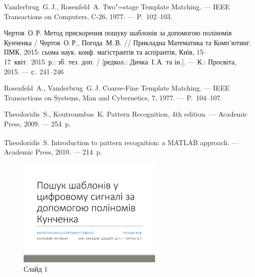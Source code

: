 \documentclass[pdftex]{thesis_utf8}
\begin{document}
\begin{thebibliography}
    Vanderbrug~G.\,J., Rosenfeld~A. Two"=stage Template Matching. --- IEEE Transactions on Computers, C-26, 1977. ---
    P.~102--103.

    Чертов~О.\,Р. Метод прискорення пошуку шаблонів за допомогою поліномів Кунченка / Чертов~О.\,Р., Погода~М.\,В. //
    Прикладна Математика та Комп’ютинг. ПМК, 2015: сьома наук. конф. магістрантів та аспірантів, Київ,
    15--17~квіт.~2015~р.: зб. тез. доп. / [редкол.: Дичка~І.\,А. та ін.]. --- К.: Просвіта, 2015. — с.~241--246

    Rosenfeld~A., Vanderbrug~G.\,J. Coarse-Fine Template Matching. --- IEEE Transactions on Systems, Man and
    Cybernetics, 7, 1977. --- P.~104--107.

    Theodoridis~S., Koutroumbas~K. Pattern Recognition, 4th edition. --- Academic Press, 2009. --- 254~p.

    Theodoridis~S. Introduction to pattern recognition: a MATLAB\textsuperscript{\textregistered} approach. ---
    Academic Press, 2010. --- 214~p.
\end{thebibliography}


\clearpage






\begin{figure}[h]
    \centering
    \includegraphics[width=0.63\textwidth]{slides/slide01.png}
    \caption{Слайд 1}
\end{figure}
\end{document}

